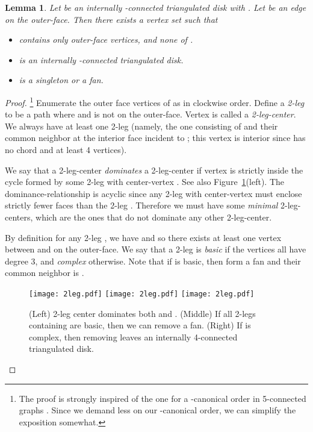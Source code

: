 \documentclass[12pt]{article}
\newtheorem{lemma}{Lemma}
\begin{document}
\begin{lemma}
\label{lem:find}
Let  be an internally -connected triangulated disk with .  
Let  be an edge on the outer-face. 
Then there exists a vertex set  such that
\begin{itemize}
\item  contains only outer-face vertices, and none of .
\item  is an internally -connected triangulated disk.
\item  is a singleton or a fan.
\end{itemize}
\end{lemma}


\begin{proof}
\footnote{The proof is strongly inspired of the one 
for a -canonical order in 5-connected graphs \cite{NN00}.
Since we demand
less on our -canonical order, we can simplify the exposition
somewhat.}
Enumerate the outer face vertices of  as  in
clockwise order.  Define a {\em 2-leg} to be a path  where
 and  is not on the outer-face.
Vertex  is called a {\em 2-leg-center}.  We always have at least one
2-leg (namely, the one consisting of  and their common 
neighbor at the interior face incident to ; this vertex is 
interior since  has no chord and at least 4 vertices).

We say that a 2-leg-center  {\em dominates} a 2-leg-center  if vertex
 is strictly inside the cycle  formed by 
some 2-leg  with center-vertex .  See also
Figure~\ref{fig:2leg}(left).
The dominance-relationship 
is acyclic since any 2-leg with center-vertex  must enclose strictly 
fewer faces than the 2-leg .  Therefore we must have some
{\em minimal} 2-leg-centers, which are the ones that do not dominate any
other 2-leg-center.

By definition for any 2-leg , we have  and so 
there exists at least one vertex between  and 
on the outer-face.  
We say that a 2-leg  is {\em basic} if the vertices
 all have degree 3, and {\em complex} otherwise.
Note that if  is basic, then  form
a fan and their common neighbor is .

\begin{figure}[ht]
\hspace*{\fill}
\texttt{[image: 2leg.pdf]}
\hspace*{\fill}
\texttt{[image: 2leg.pdf]}
\hspace*{\fill}
\texttt{[image: 2leg.pdf]}
\hspace*{\fill}
\caption{(Left) 2-leg center  dominates both  and .
(Middle)  If all 2-legs containing  are basic, then we can remove a fan.
(Right) If  is complex, then removing  leaves
an internally 4-connected triangulated disk.}
\label{fig:2leg}
\end{figure}


\end{proof}
\end{document}
